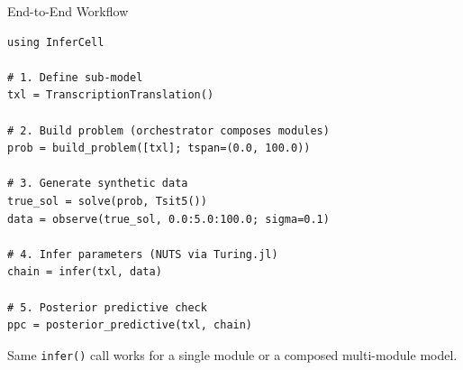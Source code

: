 \documentclass[aspectratio=169]{beamer}
\begin{document}
\begin{frame}{End-to-End Workflow}
	\begin{lstlisting}[style=julia]
using InferCell

# 1. Define sub-model
txl = TranscriptionTranslation()

# 2. Build problem (orchestrator composes modules)
prob = build_problem([txl]; tspan=(0.0, 100.0))

# 3. Generate synthetic data
true_sol = solve(prob, Tsit5())
data = observe(true_sol, 0.0:5.0:100.0; sigma=0.1)

# 4. Infer parameters (NUTS via Turing.jl)
chain = infer(txl, data)

# 5. Posterior predictive check
ppc = posterior_predictive(txl, chain)
	\end{lstlisting}

	\medskip
	{\small Same \texttt{infer()} call works for a single module or a composed multi-module model.}
\end{frame}


\end{document}

